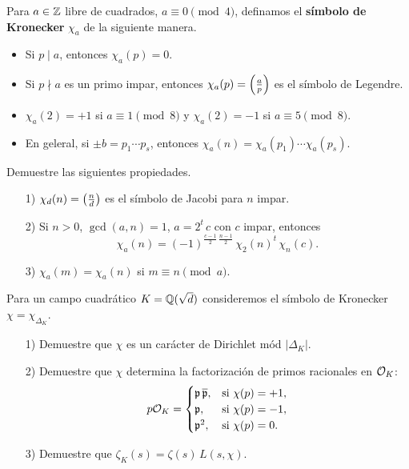 \begin{ejercicio}
  Para $a \in \mathbb{Z}$ libre de cuadrados, $a \equiv 0 \pmod{4}$, definamos el
  \textbf{símbolo de Kronecker} $\chi_a$ de la siguiente manera.
  \begin{itemize}
  \item Si $p \mid a$, entonces $\chi_a (p) = 0$.
  \item Si $p \nmid a$ es un primo impar, entonces $\chi_a (p) = \left(\frac{a}{p}\right)$
    es el símbolo de Legendre.
  \item $\chi_a (2) = +1$ si $a \equiv 1 \pmod{8}$ y $\chi_a (2) = -1$ si
    $a \equiv 5 \pmod{8}$.
  \item En geleral, si $\pm b = p_1 \cdots p_s$, entonces
    $\chi_a (n) = \chi_a (p_1) \cdots \chi_a (p_s)$.
  \end{itemize}

  Demuestre las siguientes propiedades.
  \begin{enumerate}
  \item[1)] $\chi_d (n) = \left(\frac{n}{d}\right)$ es el símbolo de Jacobi para $n$
    impar.
  \item[2)] Si $n > 0$, $\gcd (a,n) = 1$, $a = 2^t\,c$ con $c$ impar, entonces
    $$\chi_a (n) = (-1)^{\frac{c-1}{2}\,\frac{n-1}{2}}\,\chi_2 (n)^t \, \chi_n (c).$$
  \item[3)] $\chi_a (m) = \chi_a (n)$ si $m \equiv n \pmod{a}$.
  \end{enumerate}
\end{ejercicio}

\begin{ejercicio}
  \label{ejerc:caracter-para-campo-cuadratico}
  Para un campo cuadrático $K = \mathbb{Q} (\sqrt{d})$ consideremos el símbolo de
  Kronecker $\chi = \chi_{\Delta_K}$.

  \begin{enumerate}
  \item[1)] Demuestre que $\chi$ es un carácter de Dirichlet mód $|\Delta_K|$.

  \item[2)] Demuestre que $\chi$ determina la factorización de primos
    racionales en $\mathcal{O}_K$:
    \[ p\mathcal{O}_K = \begin{cases}
      \mathfrak{p}\,\overline{\mathfrak{p}}, & \text{si } \chi (p) = +1,\\
      \mathfrak{p}, & \text{si } \chi (p) = -1,\\
      \mathfrak{p}^2, & \text{si } \chi (p) = 0.
    \end{cases} \]

  \item[3)] Demuestre que $\zeta_K (s) = \zeta (s) \, L (s,\chi)$.
  \end{enumerate}
\end{ejercicio}

